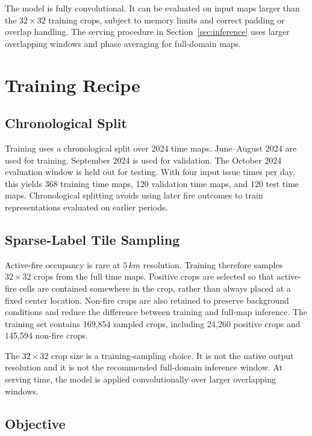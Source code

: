 \documentclass[11pt]{article}
\newcommand{\grid}{5\,km}
\begin{document}
The model is fully convolutional.
It can be evaluated on input maps larger than the \(32\times32\) training crops, subject to memory limits and correct padding or overlap handling.
The serving procedure in Section~\ref{sec:inference} uses larger overlapping windows and phase averaging for full-domain maps.

\section{Training Recipe}
\label{sec:training}

\subsection{Chronological Split}

Training uses a chronological split over 2024 time maps.
June--August 2024 are used for training.
September 2024 is used for validation.
The October 2024 evaluation window is held out for testing.
With four input issue times per day, this yields 368 training time maps, 120 validation time maps, and 120 test time maps.
Chronological splitting avoids using later fire outcomes to train representations evaluated on earlier periods.

\subsection{Sparse-Label Tile Sampling}

Active-fire occupancy is rare at \(\grid\) resolution.
Training therefore samples \(32\times32\) crops from the full time maps.
Positive crops are selected so that active-fire cells are contained somewhere in the crop, rather than always placed at a fixed center location.
Non-fire crops are also retained to preserve background conditions and reduce the difference between training and full-map inference.
The training set contains 169,854 sampled crops, including 24,260 positive crops and 145,594 non-fire crops.

The \(32\times32\) crop size is a training-sampling choice.
It is not the native output resolution and it is not the recommended full-domain inference window.
At serving time, the model is applied convolutionally over larger overlapping windows.

\subsection{Objective}
\end{document}
